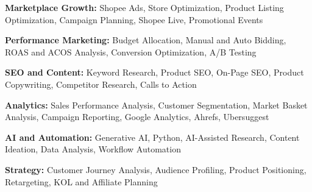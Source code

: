 \textbf{Marketplace Growth:} Shopee Ads, Store Optimization, Product Listing Optimization, Campaign Planning, Shopee Live, Promotional Events\par
\textbf{Performance Marketing:} Budget Allocation, Manual and Auto Bidding, ROAS and ACOS Analysis, Conversion Optimization, A/B Testing\par
\textbf{SEO and Content:} Keyword Research, Product SEO, On-Page SEO, Product Copywriting, Competitor Research, Calls to Action\par
\textbf{Analytics:} Sales Performance Analysis, Customer Segmentation, Market Basket Analysis, Campaign Reporting, Google Analytics, Ahrefs, Ubersuggest\par
\textbf{AI and Automation:} Generative AI, Python, AI-Assisted Research, Content Ideation, Data Analysis, Workflow Automation\par
\textbf{Strategy:} Customer Journey Analysis, Audience Profiling, Product Positioning, Retargeting, KOL and Affiliate Planning
